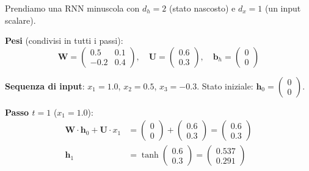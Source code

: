 \documentclass[12pt,a4paper]{article}
\begin{document}
\begin{examplebox}
Prendiamo una RNN minuscola con $d_h = 2$ (stato nascosto) e $d_x = 1$ (un input scalare).

\textbf{Pesi} (condivisi in tutti i passi):
\[
\mathbf{W} = \begin{pmatrix} 0.5 & 0.1 \\ -0.2 & 0.4 \end{pmatrix}, \quad
\mathbf{U} = \begin{pmatrix} 0.6 \\ 0.3 \end{pmatrix}, \quad
\mathbf{b}_h = \begin{pmatrix} 0 \\ 0 \end{pmatrix}
\]

\textbf{Sequenza di input}: $x_1 = 1.0$, $x_2 = 0.5$, $x_3 = -0.3$. Stato iniziale: $\mathbf{h}_0 = \begin{pmatrix} 0 \\ 0 \end{pmatrix}$.

\textbf{Passo $t = 1$} ($x_1 = 1.0$):
\begin{align*}
    \mathbf{W} \cdot \mathbf{h}_0 + \mathbf{U} \cdot x_1 &= \begin{pmatrix} 0 \\ 0 \end{pmatrix} + \begin{pmatrix} 0.6 \\ 0.3 \end{pmatrix} = \begin{pmatrix} 0.6 \\ 0.3 \end{pmatrix} \\
    \mathbf{h}_1 &= \tanh\begin{pmatrix} 0.6 \\ 0.3 \end{pmatrix} = \begin{pmatrix} 0.537 \\ 0.291 \end{pmatrix}
\end{align*}


\end{examplebox}
\end{document}
